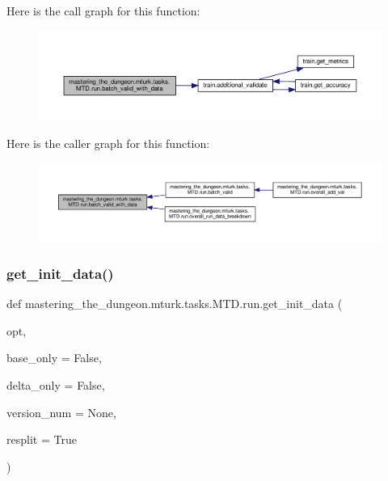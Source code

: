 Here is the call graph for this function\+:
\nopagebreak
\begin{figure}[H]
\begin{center}
\leavevmode
\includegraphics[width=350pt]{namespacemastering__the__dungeon_1_1mturk_1_1tasks_1_1MTD_1_1run_a3952413e8c53e750ab43a0098c646d39_cgraph}
\end{center}
\end{figure}
Here is the caller graph for this function\+:
\nopagebreak
\begin{figure}[H]
\begin{center}
\leavevmode
\includegraphics[width=350pt]{namespacemastering__the__dungeon_1_1mturk_1_1tasks_1_1MTD_1_1run_a3952413e8c53e750ab43a0098c646d39_icgraph}
\end{center}
\end{figure}
\mbox{\label{namespacemastering__the__dungeon_1_1mturk_1_1tasks_1_1MTD_1_1run_af11196d8dedb6354bfadb6fe86276a04}} 
\subsubsection{\texorpdfstring{get\+\_\+init\+\_\+data()}{get\_init\_data()}}
{\footnotesize\ttfamily def mastering\+\_\+the\+\_\+dungeon.\+mturk.\+tasks.\+M\+T\+D.\+run.\+get\+\_\+init\+\_\+data (\begin{DoxyParamCaption}\item[{}]{opt,  }\item[{}]{base\+\_\+only = {\ttfamily False},  }\item[{}]{delta\+\_\+only = {\ttfamily False},  }\item[{}]{version\+\_\+num = {\ttfamily None},  }\item[{}]{resplit = {\ttfamily True} }\end{DoxyParamCaption})}



